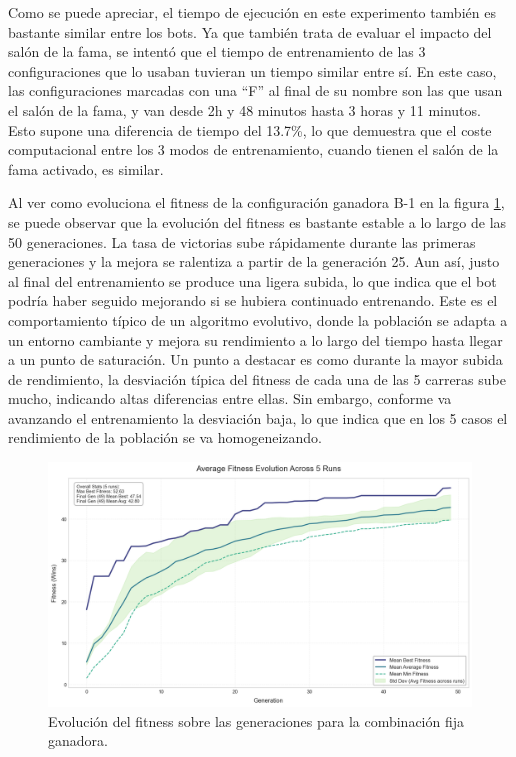 Como se puede apreciar, el tiempo de ejecución en este experimento también es bastante similar entre los bots. Ya que también trata de evaluar el impacto del salón de la fama, se intentó que el tiempo de entrenamiento de las 3 configuraciones que lo usaban tuvieran un tiempo similar entre sí. En este caso, las configuraciones marcadas con una ``F'' al final de su nombre son las que usan el salón de la fama, y van desde 2h y 48 minutos hasta 3 horas y 11 minutos. Esto supone una diferencia de tiempo del 13.7\%, lo que demuestra que el coste computacional entre los 3 modos de entrenamiento, cuando tienen el salón de la fama activado, es similar.

Al ver como evoluciona el fitness de la configuración ganadora B-1 en la figura \ref{fig:fixed_fitness_evolution}, se puede observar que la evolución del fitness es bastante estable a lo largo de las 50 generaciones. La tasa de victorias sube rápidamente durante las primeras generaciones y la mejora se ralentiza a partir de la generación 25. Aun así, justo al final del entrenamiento se produce una ligera subida, lo que indica que el bot podría haber seguido mejorando si se hubiera continuado entrenando. Este es el comportamiento típico de un algoritmo evolutivo, donde la población se adapta a un entorno cambiante y mejora su rendimiento a lo largo del tiempo hasta llegar a un punto de saturación. Un punto a destacar es como durante la mayor subida de rendimiento, la desviación típica del fitness de cada una de las 5 carreras sube mucho, indicando altas diferencias entre ellas. Sin embargo, conforme va avanzando el entrenamiento la desviación baja, lo que indica que en los 5 casos el rendimiento de la población se va homogeneizando.

\begin{figure}[H]
	\centering
	\includegraphics[width=1.0\textwidth]{img/fixed_fitness_evolution.png}
	\caption{Evolución del fitness sobre las generaciones para la combinación fija ganadora.}
	\label{fig:fixed_fitness_evolution}
\end{figure}

